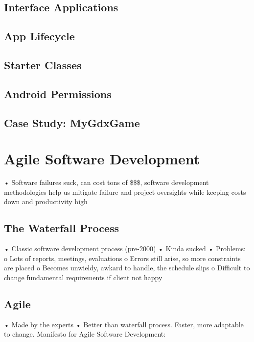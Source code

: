 \documentclass[11pt]{article}
\begin{document}
\subsection{Interface Applications}
\subsection{App Lifecycle}
\subsection{Starter Classes}
\subsection{Android Permissions}
\subsection{Case Study: MyGdxGame}

\section{Agile Software Development}
• Software failures suck, can cost tons of \$\$\$, software development methodologies help us mitigate
failure and project oversights while keeping costs down and productivity high
\subsection{The Waterfall Process}
• Classic software development process (pre-2000)
• Kinda sucked
• Problems:
o Lots of reports, meetings, evaluations
o Errors still arise, so more constraints are placed
o Becomes unwieldy, awkard to handle, the schedule slips
o Difficult to change fundamental requirements if client not happy
\subsection{Agile}
• Made by the experts
• Better than waterfall process. Faster, more adaptable to change.
Manifesto for Agile Software Development:
\end{document}
